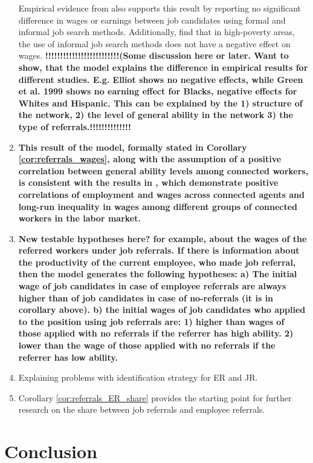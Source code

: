 \documentclass[12pt]{article}
\begin{document}
\begin{enumerate}
    Empirical evidence from \cite{campbell1985job} also supports this result by reporting no significant difference in wages or earnings between job candidates using formal and informal job search methods. Additionally, \cite{elliott1999social} find that in high-poverty areas, the use of informal job search methods does not have a negative effect on wages. \textbf{!!!!!!!!!!!!!!!!!!!!!!!!!(Some discussion here or later. Want to show, that the model explains the difference in empirical results for different studies. E.g. Elliot shows no negative effects, while Green et al. 1999 shows no earning effect for Blacks, negative effects for Whites and Hispanic. This can be explained by the 1) structure of the network, 2) the level of general ability in the network 3) the type of referrals.!!!!!!!!!!!!!!}
    \item \textbf{
    This result of the model, formally stated in Corollary \ref{cor:referrals_wages}, along with the assumption of a positive correlation between general ability levels among connected workers, is consistent with the results in \cite{calvo2004effects}, which demonstrate positive correlations of employment and wages across connected agents and long-run inequality in wages among different groups of connected workers in the labor market. 
    }
    \item \textbf{New testable hypotheses here? for example, about the wages of the referred workers under job referrals. If there is information about the productivity of the current employee, who made job referral, then the model generates the following hypotheses: a) The initial wage of job candidates in case of employee referrals are always higher than of job candidates in case of no-referrals (it is in corollary above). b) the initial wages of job candidates who applied to the position using job referrals are: 1) higher than wages of those applied with no referrals if the referrer has high ability. 2) lower than the wage of those applied with no referrals if the referrer has low ability.}
    \item Explaining problems with identification strategy for ER and JR.
    \item Corollary \ref{cor:referrals_ER_share} provides the starting point for further research on the share between job referrals and employee referrals. 
\end{enumerate}

\section{Conclusion} \label{sec:conclusion}
\end{document}
